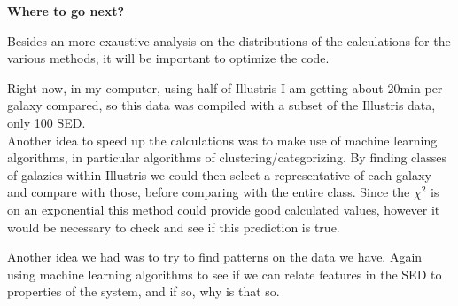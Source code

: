 \documentclass[11pt]{report}
\begin{document}
{\bf Where to go next?}

Besides an more exaustive analysis on the distributions of the calculations for the various methods, it will be important to optimize the code.

Right now, in my computer, using half of Illustris I am getting about 20min per galaxy compared, so this data was compiled with a subset of the Illustris data, only 100 SED.\\

Another idea to speed up the calculations was to make use of machine learning algorithms, in particular algorithms of clustering/categorizing. By finding classes of galazies within Illustris we could then select a representative of each galaxy and compare with those, before comparing with the entire class. Since the $\chi^2$ is on an exponential this method could provide good calculated values, however it would be necessary to check and see if this prediction is true.

Another idea we had was to try to find patterns on the data we have. Again using machine learning algorithms to see if we can relate features in the SED to properties of the system, and if so, why is that so.
\end{document}
